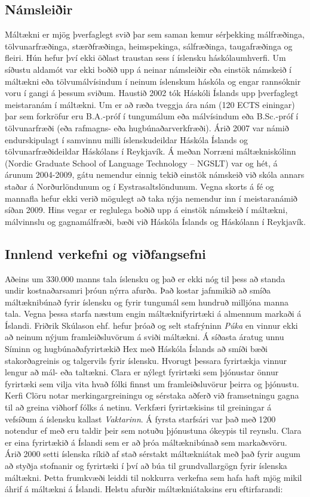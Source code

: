 \documentclass{../../metanetpaper}
\begin{document}
\begin{multicols}{2}
\subsection{Námsleiðir}
Máltækni er mjög þverfaglegt svið þar sem saman kemur sérþekking málfræðinga, tölvunarfræðinga, stærðfræðinga, heimspekinga, sálfræðinga, taugafræðinga og fleiri. Hún hefur því ekki öðlast traustan sess í íslensku háskólaumhverfi. Um síðustu aldamót var ekki boðið upp á neinar námsleiðir eða einstök námskeið í máltækni eða tölvumálvísindum í neinum íslenskum háskóla og engar rannsóknir voru í gangi á þessum sviðum. 
Haustið 2002 tók Háskóli Íslands upp þverfaglegt meistaranám í máltækni. Um er að ræða tveggja ára nám (120 ECTS einingar) þar sem forkröfur eru B.A.-próf í tungumálum eða málvísindum eða B.Sc.-próf í tölvunarfræði (eða rafmagns- eða hugbúnaðarverkfræði). Árið 2007 var námið endurskipulagt í samvinnu milli íslenskudeildar Háskóla Íslands og tölvunarfræðideildar Háskólans í Reykjavík. Á meðan Norræni máltækniskólinn (Nordic Graduate School of Language Technology -- NGSLT) var og hét, á árunum 2004-2009, gátu nemendur einnig tekið einstök námskeið við skóla annars staðar á Norðurlöndunum og í Eystrasaltslöndunum.
Vegna skorts á fé og mannafla hefur ekki verið mögulegt að taka nýja nemendur inn í meistaranámið síðan 2009. Hins vegar er reglulega boðið upp á einstök námskeið í máltækni, málvinnslu og gagnamálfræði, bæði við Háskóla Íslands og Háskólann í Reykjavík.

\subsection{Innlend verkefni og viðfangsefni}

Aðeins um 330.000 manns tala íslensku og það er ekki nóg til þess að standa undir kostnaðarsamri þróun nýrra afurða. Það kostar jafnmikið að smíða máltæknibúnað fyrir íslensku og fyrir tungumál sem hundruð milljóna manna tala. Vegna þessa starfa næstum engin máltæknifyrirtæki á almennum markaði á Íslandi. Friðrik Skúlason ehf. hefur þróað og selt stafrýninn \textit{Púka} en vinnur ekki að neinum nýjum framleiðsluvörum á sviði máltækni. Á síðasta áratug unnu Síminn og hugbúnaðafyrirtækið Hex með Háskóla Íslands að smíði bæði stakorðagreinis og talgervils fyrir íslensku. Hvorugt þessara fyrirtækja vinnur lengur að mál- eða taltækni.
Clara er nýlegt fyrirtæki sem þjónustar önnur fyrirtæki sem vilja vita hvað fólki finnst um framleiðsluvörur þeirra og þjónustu. Kerfi Clöru notar merkingargreiningu og sérstaka aðferð við framsetningu gagna til að greina viðhorf fólks á netinu. Verkfæri fyrirtækisins til greiningar á vefsíðum á íslensku kallast \textit{Vaktarinn}\cite{vak1}.  Á fyrsta starfsári var það með 1200 notendur ef með eru taldir þeir sem notuðu þjónustuna ókeypis til reynslu. Clara er eina fyrirtækið á Íslandi sem er að þróa máltæknibúnað sem markaðsvöru.
Árið 2000 setti íslenska ríkið af stað sérstakt máltækniátak með það fyrir augum að styðja stofnanir og fyrirtæki í því að búa til grundvallargögn fyrir íslenska máltækni. Þetta frumkvæði leiddi til nokkurra verkefna sem hafa haft mjög mikil áhrif á máltækni á Íslandi. Helstu afurðir máltækniátaksins eru eftirfarandi:\cite{ilrt1}  


\end{multicols}
\end{document}
